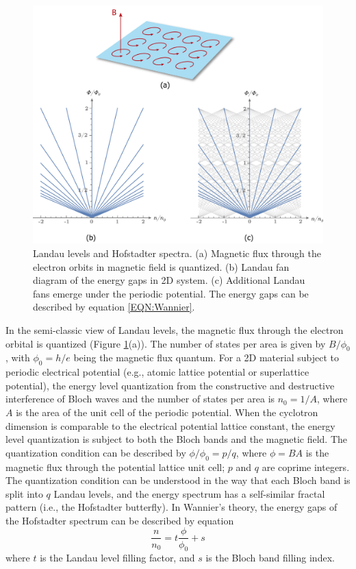 \documentclass[pdflatex, sectionletters, 12pt]{pittetd}    %
\begin{document}
\begin{figure}[h!]
	\centering
	\includegraphics[width=1.0\textwidth]{Drawing/HofstadterLandau.pdf}
	\caption{Landau levels and Hofstadter spectra. (a) Magnetic flux through the electron orbits in magnetic field is quantized. (b) Landau fan diagram of the energy gaps in 2D system. (c) Additional Landau fans emerge under the periodic potential. The energy gaps can be described by equation \ref{EQN:Wannier}.}
	\label{FIG:HofstadterLandau}
\end{figure}

In the semi-classic view of Landau levels, the magnetic flux through the electron orbital is quantized (Figure \ref{FIG:HofstadterLandau}(a)). The number of states per area is given by $B/\phi_0$, with $\phi_0 = h/e$ being the magnetic flux quantum. For a 2D material subject to periodic electrical potential (e.g., atomic lattice potential or superlattice potential), the energy level quantization from the constructive and destructive interference of Bloch waves and the number of states per area is $n_0 = 1/A$, where $A$ is the area of the unit cell of the periodic potential\cite{hofstadter1976energy}. When the cyclotron dimension is comparable to the electrical potential lattice constant, the energy level quantization is subject to both the Bloch bands and the magnetic field. The quantization condition can be described by $\phi/\phi_0 = p/q$, where $\phi = BA$ is the magnetic flux through the potential lattice unit cell; $p$ and $q$ are coprime integers\cite{hofstadter1976energy}. The quantization condition can be understood in the way that each Bloch band is split into $q$ Landau levels, and the energy spectrum has a self-similar fractal pattern (i.e., the Hofstadter butterfly). In Wannier's theory\cite{wannier1978result}, the energy gaps of the Hofstadter spectrum can be described by equation 
\begin{equation}
\label{EQN:Wannier}
\frac{n}{n_0} = t\frac{\phi}{\phi_0} + s
\end{equation}
where $t$ is the Landau level filling factor, and $s$ is the Bloch band filling index\cite{streda1982quantised, thouless1984quantized}.
\end{document}
